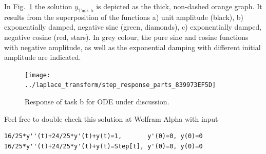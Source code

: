 \documentclass[11pt,a4paper,DIV=12]{scrartcl}
\begin{document}
In Fig.~\ref{fig:step_response_parts} the solution $y_\text{Task b}$ is depicted
as the thick, non-dashed orange graph. It results from the superposition of the
functions
a) unit amplitude (black),
b) exponentially damped, negative sine (green, diamonds),
c) exponentially damped, negative cosine (red, stars).
In grey colour, the pure sine and cosine functions with negative amplitude,
as well as the exponential
damping with different initial amplitude are indicated.

\begin{figure}[h!]
\centering
\texttt{[image: ../laplace\_transform/step\_response\_parts\_839973EF5D]}
\caption{Response of task b for ODE under discussion.}
\label{fig:step_response_parts}
\end{figure}

Feel free to double check this solution at Wolfram Alpha with input
\begin{verbatim}
16/25*y''(t)+24/25*y'(t)+y(t)=1,       y'(0)=0, y(0)=0
16/25*y''(t)+24/25*y'(t)+y(t)=Step[t], y'(0)=0, y(0)=0
\end{verbatim}




\end{document}
